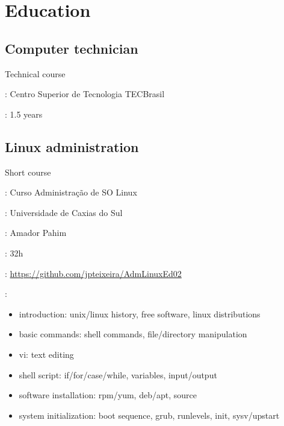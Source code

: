 \section*{Education}
\subsection*{Computer technician}

Technical course

\begin{description}[noitemsep]
    \item[Institution]: Centro Superior de Tecnologia TECBrasil
    \item[Duration]: 1.5 years
\end{description}

\subsection*{Linux administration}

Short course

\begin{description}[noitemsep]
    \item[Original title]: Curso Administração de SO Linux
    \item[Institution]: Universidade de Caxias do Sul
    \item[Instructor]: Amador Pahim
    \item[Duration]: 32h
    \item[Website]: \url{https://github.com/jpteixeira/AdmLinuxEd02}
    \item[Topics]:
        \begin{itemize}[noitemsep]
            \item
                introduction: unix/linux history, free software, linux
                distributions
            \item basic commands: shell commands, file/directory manipulation
            \item vi: text editing
            \item shell script: if/for/case/while, variables, input/output
            \item software installation: rpm/yum, deb/apt, source
            \item
                system initialization: boot sequence, grub, runlevels, init,
                sysv/upstart
        \end{itemize}
\end{description}

